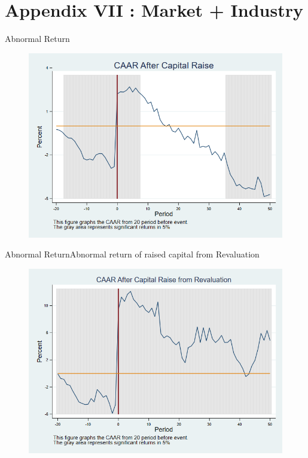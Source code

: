 \documentclass{beamer}
\begin{document}
\section{Appendix VII : Market + Industry}

\begin{frame}{Abnormal Return}
	\label{car_marketindustry}
	\begin{figure}
		\centering
		\includegraphics[width=0.7\linewidth]{Output/car_marketindustry.png}
		\label{fig:car_marketindustry}
	\end{figure}
\end{frame}

\begin{frame}{Abnormal Return}{Abnormal return of raised capital from Revaluation}
	\label{car_marketindustryRevaluation}
	\begin{figure}
		\centering
		\includegraphics[width=0.65\linewidth]{Output/car_marketindustryRevaluation}
		\label{fig:car_markeindustryindustrytRevaluation}
	\end{figure}
	
\end{frame}
\end{document}

